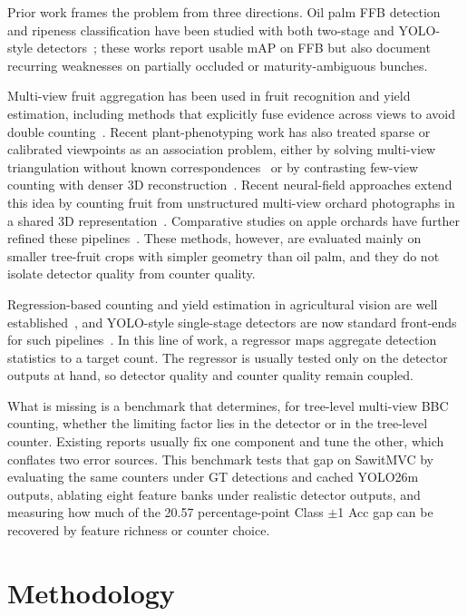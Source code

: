 \documentclass[conference]{IEEEtran}
\begin{document}
Prior work frames the problem from three directions. Oil palm FFB detection and
ripeness classification have been studied with both two-stage and YOLO-style
detectors~\cite{ref9,ref10,ref11,ref13}; these works report usable mAP on FFB
but also document recurring weaknesses on partially occluded or
maturity-ambiguous bunches.

Multi-view fruit aggregation has been used in fruit recognition and yield
estimation, including methods that explicitly fuse evidence across views to
avoid double counting~\cite{ref2,ref5,ref6}. Recent plant-phenotyping work has
also treated sparse or calibrated viewpoints as an association problem, either
by solving multi-view triangulation without known correspondences~\cite{ref3}
or by contrasting few-view counting with denser 3D reconstruction~\cite{ref4}.
Recent neural-field approaches extend this idea by counting fruit from
unstructured multi-view orchard photographs in a shared 3D representation~\cite{ref8}.
Comparative studies on apple orchards have further refined these
pipelines~\cite{ref6,ref7}. These methods, however, are evaluated mainly on
smaller tree-fruit crops with simpler geometry than oil palm, and they do not
isolate detector quality from counter quality.

Regression-based counting and yield estimation in agricultural vision are well
established~\cite{ref1,ref6,ref7}, and YOLO-style single-stage detectors are now
standard front-ends for such pipelines~\cite{ref14,ref15}. In this line of work,
a regressor maps aggregate detection statistics to a target count. The
regressor is usually tested only on the detector outputs at hand, so detector
quality and counter quality remain coupled.

What is missing is a benchmark that determines, for tree-level multi-view BBC
counting, whether the limiting factor lies in the detector or in the tree-level
counter. Existing reports usually fix one component and tune the other, which
conflates two error sources. This benchmark tests that gap on SawitMVC by
evaluating the same counters under GT detections and cached YOLO26m outputs,
ablating eight feature banks under realistic detector outputs, and measuring how
much of the 20.57 percentage-point Class $\pm$1 Acc gap can be recovered by
feature richness or counter choice.

\section{Methodology}
\end{document}
